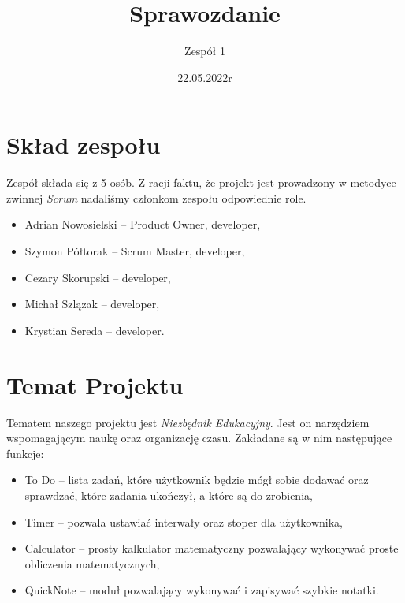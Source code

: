 \documentclass[10pt, a4paper]{report}
\title{\huge{\textbf{Sprawozdanie}}}
\author{Zespół 1}
\date{22.05.2022r}
\begin{document}
\maketitle

\renewcommand*\thesection{\arabic{section}} 

\pagestyle{fancy}
\fancyhf{}

\tableofcontents
\newpage

\section{Skład zespołu}
Zespół składa się z 5 osób. Z racji faktu, że projekt jest prowadzony w metodyce zwinnej \textit{Scrum} nadaliśmy członkom zespołu odpowiednie role.

\begin{itemize}
    \item Adrian Nowosielski -- Product Owner, developer,
    \item Szymon Półtorak -- Scrum Master, developer,
    \item Cezary Skorupski -- developer,
    \item Michał Szlązak -- developer,
    \item Krystian Sereda -- developer.
\end{itemize}

\section{Temat Projektu}
Tematem naszego projektu jest \textit{Niezbędnik Edukacyjny}. Jest on narzędziem wspomagającym naukę oraz organizację czasu.
Zakładane są w nim następujące funkcje:
\begin{itemize}
    \item To Do -- lista zadań, które użytkownik będzie mógł sobie dodawać oraz sprawdzać, które zadania ukończył, a które są do zrobienia,
    \item Timer -- pozwala ustawiać interwały oraz stoper dla użytkownika,
    \item Calculator -- prosty kalkulator matematyczny pozwalający wykonywać proste obliczenia matematycznych,
    \item QuickNote -- moduł pozwalający wykonywać i zapisywać szybkie notatki.
\end{itemize}
\end{document}
